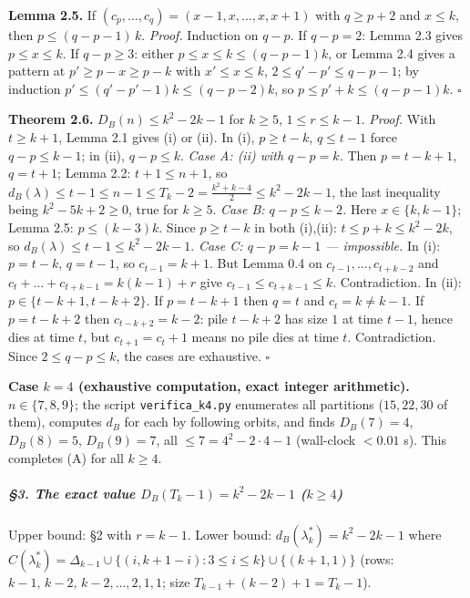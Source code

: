 \documentclass[11pt,a4paper]{article}
\begin{document}
\textbf{Lemma 2.5.} If \((c_p,\dots,c_q)=(x-1,x,\dots,x,x+1)\) with
\(q\ge p+2\) and \(x\le k\), then \(p\le (q-p-1)\,k\). \emph{Proof.}
Induction on \(q-p\). If \(q-p=2\): Lemma 2.3 gives \(p\le x\le k\). If
\(q-p\ge3\): either \(p\le x\le k\le(q-p-1)k\), or Lemma 2.4 gives a
pattern at \(p'\ge p-x\ge p-k\) with \(x'\le x\le k\),
\(2\le q'-p'\le q-p-1\); by induction \(p'\le(q'-p'-1)k\le(q-p-2)k\), so
\(p\le p'+k\le(q-p-1)k\). \(\square\)

\textbf{Theorem 2.6.} \(D_B(n)\le k^2-2k-1\) for \(k\ge5\),
\(1\le r\le k-1\). \emph{Proof.} With \(t\ge k+1\), Lemma 2.1 gives (i)
or (ii). In (i), \(p\ge t-k\), \(q\le t-1\) force \(q-p\le k-1\); in
(ii), \(q-p\le k\). \emph{Case A: (ii) with \(q-p=k\).} Then
\(p=t-k+1\), \(q=t+1\); Lemma 2.2: \(t+1\le n+1\), so
\(d_B(\lambda)\le t-1\le n-1\le T_k-2=\tfrac{k^2+k-4}{2}\le k^2-2k-1\),
the last inequality being \(k^2-5k+2\ge0\), true for \(k\ge5\).
\emph{Case B: \(q-p\le k-2\).} Here \(x\in\{k,k-1\}\); Lemma 2.5:
\(p\le(k-3)k\). Since \(p\ge t-k\) in both (i),(ii):
\(t\le p+k\le k^2-2k\), so \(d_B(\lambda)\le t-1\le k^2-2k-1\).
\emph{Case C: \(q-p=k-1\) --- impossible.} In (i): \(p=t-k\), \(q=t-1\),
so \(c_{t-1}=k+1\). But Lemma 0.4 on \(c_{t-1},\dots,c_{t+k-2}\) and
\(c_t+\dots+c_{t+k-1}=k(k-1)+r\) give \(c_{t-1}\le c_{t+k-1}\le k\).
Contradiction. In (ii): \(p\in\{t-k+1,t-k+2\}\). If \(p=t-k+1\) then
\(q=t\) and \(c_t=k\ne k-1\). If \(p=t-k+2\) then \(c_{t-k+2}=k-2\):
pile \(t-k+2\) has size \(1\) at time \(t-1\), hence dies at time \(t\),
but \(c_{t+1}=c_t+1\) means no pile dies at time \(t\). Contradiction.
Since \(2\le q-p\le k\), the cases are exhaustive. \(\square\)

\textbf{Case \(k=4\) (exhaustive computation, exact integer
arithmetic).} \(n\in\{7,8,9\}\); the script \texttt{verifica\_k4.py}
enumerates all partitions (\(15,22,30\) of them), computes \(d_B\) for
each by following orbits, and finds \(D_B(7)=4\), \(D_B(8)=5\),
\(D_B(9)=7\), all \(\le 7=4^2-2\cdot4-1\) (wall-clock \(<0.01\) s). This
completes (A) for all \(k\ge4\).

\subparagraph{\texorpdfstring{§3. The exact value
\(D_B(T_k-1)=k^2-2k-1\)
(\(k\ge4\))}{§3. The exact value D\_B(T\_k-1)=k\^{}2-2k-1 (k\textbackslash ge4)}}\label{the-exact-value-d_bt_k-1k2-2k-1-kge4}

Upper bound: §2 with \(r=k-1\). Lower bound:
\(d_B(\lambda^*_k)=k^2-2k-1\) where
\(C(\lambda^*_k)=\Delta_{k-1}\cup\{(i,k+1-i):3\le i\le k\}\cup\{(k+1,1)\}\)
(rows: \(k-1,\,k-2,\,k-2,\dots,2,1,1\); size \(T_{k-1}+(k-2)+1=T_k-1\)).
\end{document}
